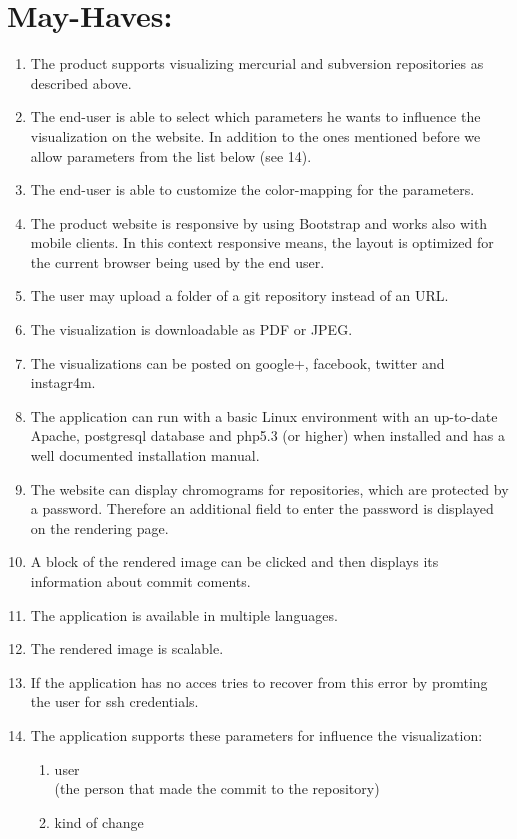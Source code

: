 \documentclass[12pt]{scrartcl}
\begin{document}
\section{May-Haves:}
\begin{enumerate}
\item The product supports visualizing mercurial and subversion repositories as described above.
\item The end-user is able to select which parameters he wants to influence the visualization on the website. In addition to the ones mentioned before we allow parameters from the list below (see 14).
\item The end-user is able to customize the color-mapping for the parameters.
\item The product website is responsive by using Bootstrap and works also with mobile clients. In this context responsive means, the layout is optimized for the current browser being used by the end user.
\item The user may upload a folder of a git repository instead of an URL.
\item The visualization is downloadable as PDF or JPEG.
\item The visualizations can be posted on google+, facebook, twitter and instagr4m.
\item The application can run with a basic Linux environment with an up-to-date Apache, postgresql database and php5.3 (or higher) when installed and has a well documented installation manual.
\item The website can display chromograms for repositories, which are protected by a password. Therefore an additional field to enter the password is displayed on the rendering page.
\item A block of the rendered image can be clicked and then displays its information about commit coments.
\item The application is available in multiple languages.
\item The rendered image is scalable.
\item If the application has no acces tries to recover from this error by promting the user for ssh credentials. 
\item The application supports these parameters for influence the visualization:
\begin{enumerate}
\item user\\
(the person that made the commit to the repository)
\item kind of change\\  

\end{enumerate}
\end{enumerate}
\end{document}
